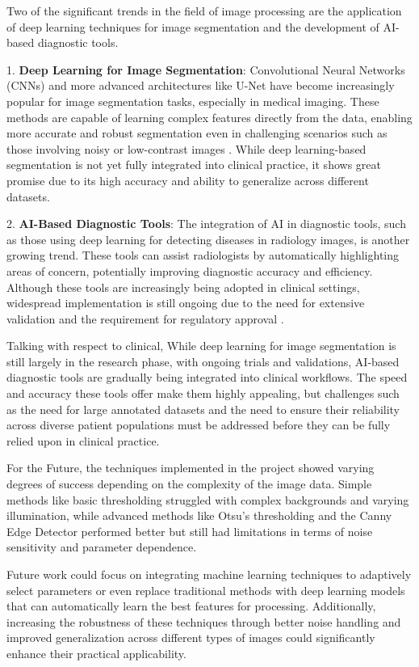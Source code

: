 \documentclass[%
	a4paper, %
	12pt, %
	english, %
	bibtotoc %
]{scrartcl}
\begin{document}
Two of the significant trends in the field of image processing are the application of deep learning techniques for image segmentation and the development of AI-based diagnostic tools.

1. \textbf{Deep Learning for Image Segmentation}: Convolutional Neural Networks (CNNs) and more advanced architectures like U-Net have become increasingly popular for image segmentation tasks, especially in medical imaging. These methods are capable of learning complex features directly from the data, enabling more accurate and robust segmentation even in challenging scenarios such as those involving noisy or low-contrast images \cite{Ronneberger2015Bio}. While deep learning-based segmentation is not yet fully integrated into clinical practice, it shows great promise due to its high accuracy and ability to generalize across different datasets.

2. \textbf{AI-Based Diagnostic Tools}: The integration of AI in diagnostic tools, such as those using deep learning for detecting diseases in radiology images, is another growing trend. These tools can assist radiologists by automatically highlighting areas of concern, potentially improving diagnostic accuracy and efficiency. Although these tools are increasingly being adopted in clinical settings, widespread implementation is still ongoing due to the need for extensive validation and the requirement for regulatory approval \cite{Esteva2017}.

Talking with respect to clinical, While deep learning for image segmentation is still largely in the research phase, with ongoing trials and validations, AI-based diagnostic tools are gradually being integrated into clinical workflows. The speed and accuracy these tools offer make them highly appealing, but challenges such as the need for large annotated datasets and the need to ensure their reliability across diverse patient populations must be addressed before they can be fully relied upon in clinical practice.

For the Future, the techniques implemented in the project showed varying degrees of success depending on the complexity of the image data. Simple methods like basic thresholding struggled with complex backgrounds and varying illumination, while advanced methods like Otsu's thresholding and the Canny Edge Detector performed better but still had limitations in terms of noise sensitivity and parameter dependence.

Future work could focus on integrating machine learning techniques to adaptively select parameters or even replace traditional methods with deep learning models that can automatically learn the best features for processing. Additionally, increasing the robustness of these techniques through better noise handling and improved generalization across different types of images could significantly enhance their practical applicability.
\end{document}
